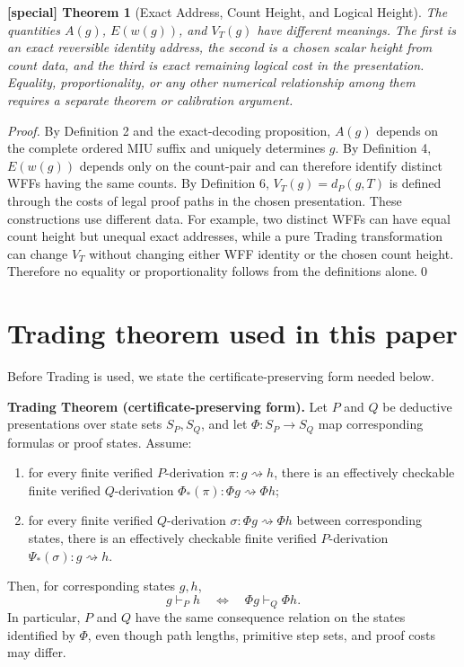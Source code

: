 \documentclass[11pt]{article}
\newtheorem{spthm}{[special] Theorem}
\begin{document}
\begin{spthm}[Exact Address, Count Height, and Logical Height]
The quantities $A(g)$, $E(w(g))$, and $V_T(g)$ have different meanings. The first is an exact reversible identity address, the second is a chosen scalar height from count data, and the third is exact remaining logical cost in the presentation. Equality, proportionality, or any other numerical relationship among them requires a separate theorem or calibration argument.
\end{spthm}
\textit{Proof.} By Definition 2 and the exact-decoding proposition, $A(g)$ depends on the complete ordered MIU suffix and uniquely determines $g$. By Definition 4, $E(w(g))$ depends only on the count-pair and can therefore identify distinct WFFs having the same counts. By Definition 6, $V_T(g)=d_P(g,T)$ is defined through the costs of legal proof paths in the chosen presentation. These constructions use different data. For example, two distinct WFFs can have equal count height but unequal exact addresses, while a pure Trading transformation can change $V_T$ without changing either WFF identity or the chosen count height. Therefore no equality or proportionality follows from the definitions alone.\qed

\section{Trading theorem used in this paper}
Before Trading is used, we state the certificate-preserving form needed below.

\textbf{Trading Theorem (certificate-preserving form).}
Let $P$ and $Q$ be deductive presentations over state sets $S_P,S_Q$, and let $\Phi:S_P\to S_Q$ map corresponding formulas or proof states. Assume:
\begin{enumerate}[label=(T\arabic*),leftmargin=2.5em]
\item for every finite verified $P$-derivation $\pi:g\rightsquigarrow h$, there is an effectively checkable finite verified $Q$-derivation $\Phi_*(\pi):\Phi g\rightsquigarrow\Phi h$;
\item for every finite verified $Q$-derivation $\sigma:\Phi g\rightsquigarrow\Phi h$ between corresponding states, there is an effectively checkable finite verified $P$-derivation $\Psi_*(\sigma):g\rightsquigarrow h$.
\end{enumerate}
Then, for corresponding states $g,h$,
\[
g\vdash_P h\quad\Longleftrightarrow\quad \Phi g\vdash_Q\Phi h.
\]
In particular, $P$ and $Q$ have the same consequence relation on the states identified by $\Phi$, even though path lengths, primitive step sets, and proof costs may differ.
\end{document}
